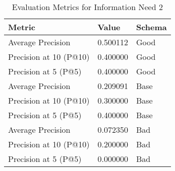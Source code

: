 \begingroup
    \renewcommand{\arraystretch}{2} %
    \begin{table}[!h]
        \centering
        \begin{tabular}{l | l | l}
            Metric & Value & Schema \\
            \hline
            Average Precision & 0.500112 & Good \\
            Precision at 10 (P@10) & 0.400000 & Good \\
            Precision at 5 (P@5) & 0.400000 & Good \\
            \hline
            Average Precision & 0.209091 & Base\\
            Precision at 10 (P@10) & 0.300000 & Base\\
            Precision at 5 (P@5) & 0.400000 & Base\\
            \hline
            Average Precision & 0.072350 & Bad\\
            Precision at 10 (P@10) & 0.200000 & Bad\\
            Precision at 5 (P@5) & 0.000000 & Bad\\
        \end{tabular}
        \caption{Evaluation Metrics for Information Need 2}
        \label{tab:metrics-info-2}
    \end{table}
\endgroup